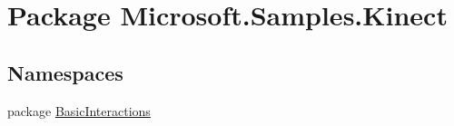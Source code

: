 \hypertarget{namespace_microsoft_1_1_samples_1_1_kinect}{\section{Package Microsoft.\-Samples.\-Kinect}
\label{namespace_microsoft_1_1_samples_1_1_kinect}
}
\subsection*{Namespaces}
\begin{DoxyCompactItemize}
\item 
package \hyperlink{namespace_microsoft_1_1_samples_1_1_kinect_1_1_basic_interactions}{Basic\-Interactions}
\end{DoxyCompactItemize}
